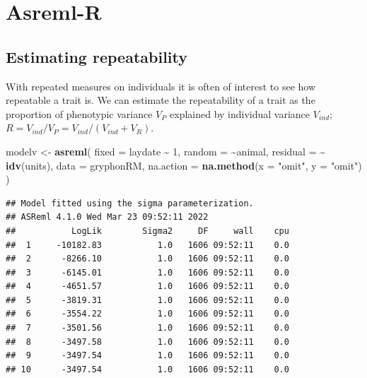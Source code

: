 \documentclass[
  12pt,
]{book}
\newenvironment{Shaded}{\begin{snugshade}}{\end{snugshade}}
\newcommand{\DataTypeTok}[1]{\textcolor[rgb]{0.13,0.29,0.53}{#1}}
\newcommand{\DecValTok}[1]{\textcolor[rgb]{0.00,0.00,0.81}{#1}}
\newcommand{\KeywordTok}[1]{\textcolor[rgb]{0.13,0.29,0.53}{\textbf{#1}}}
\newcommand{\NormalTok}[1]{#1}
\newcommand{\OperatorTok}[1]{\textcolor[rgb]{0.81,0.36,0.00}{\textbf{#1}}}
\newcommand{\StringTok}[1]{\textcolor[rgb]{0.31,0.60,0.02}{#1}}
\begin{document}
\hypertarget{asreml-r-2}{%
\section{Asreml-R}\label{asreml-r-2}}

\hypertarget{estimating-repeatability}{%
\subsection{Estimating repeatability}\label{estimating-repeatability}}

With repeated measures on individuals it is often of interest to see how repeatable a trait is.
We can estimate the repeatability of a trait as the proportion of phenotypic variance \(V_P\) explained by individual variance \(V_{ind}\); \(R = V_{ind}/V_P = V_{ind}/(V_{ind}+V_R)\).

\begin{Shaded}
\begin{Highlighting}[]
\NormalTok{modelv \textless{}{-}}\StringTok{ }\KeywordTok{asreml}\NormalTok{(}
  \DataTypeTok{fixed =}\NormalTok{ laydate }\OperatorTok{\textasciitilde{}}\StringTok{ }\DecValTok{1}\NormalTok{,}
  \DataTypeTok{random =} \OperatorTok{\textasciitilde{}}\NormalTok{animal,}
  \DataTypeTok{residual =} \OperatorTok{\textasciitilde{}}\StringTok{ }\KeywordTok{idv}\NormalTok{(units),}
  \DataTypeTok{data =}\NormalTok{ gryphonRM,}
  \DataTypeTok{na.action =} \KeywordTok{na.method}\NormalTok{(}\DataTypeTok{x =} \StringTok{"omit"}\NormalTok{, }\DataTypeTok{y =} \StringTok{"omit"}\NormalTok{)}
\NormalTok{)}
\end{Highlighting}
\end{Shaded}

\begin{verbatim}
## Model fitted using the sigma parameterization.
## ASReml 4.1.0 Wed Mar 23 09:52:11 2022
##           LogLik        Sigma2     DF     wall    cpu
##  1     -10182.83           1.0   1606 09:52:11    0.0
##  2      -8266.10           1.0   1606 09:52:11    0.0
##  3      -6145.01           1.0   1606 09:52:11    0.0
##  4      -4651.57           1.0   1606 09:52:11    0.0
##  5      -3819.31           1.0   1606 09:52:11    0.0
##  6      -3554.22           1.0   1606 09:52:11    0.0
##  7      -3501.56           1.0   1606 09:52:11    0.0
##  8      -3497.58           1.0   1606 09:52:11    0.0
##  9      -3497.54           1.0   1606 09:52:11    0.0
## 10      -3497.54           1.0   1606 09:52:11    0.0
\end{verbatim}
\end{document}
